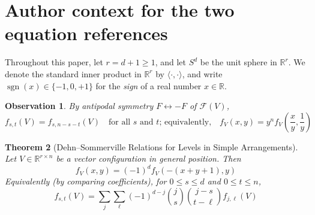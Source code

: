 \documentclass[11pt]{article}
\newtheorem{theorem}{Theorem}
\newtheorem{observation}[theorem]{Observation}
\DeclareMathOperator{\sgn}{sgn}
\renewcommand{\leq}{\leqslant}
\renewcommand{\geq}{\geqslant}
\newcommand{\R}{\mathbb{R}}
\begin{document}
\section*{Author context for the two equation references}
Throughout this paper, let $r=d+1 \geq 1$, and let $S^d$ be the unit sphere in $\R^r$. We denote the standard inner product in $\R^r$ by $\langle\cdot ,\cdot \rangle$, and write $\sgn(x)\in \{-1,0,+1\}$ for the \emph{sign} of a real number 
$x\in \R$. %
\begin{observation} 
\label{obs:f-antipodal-symm} By antipodal symmetry $F\leftrightarrow -F$ of $\mathcal{F}(V)$, 
\begin{equation}
\label{eq:f-symm}
f_{s,t}(V)=f_{s,n-s-t}(V) \quad \textrm{for all $s$ and $t$; equivalently,} \textstyle \quad f_V(x,y)= y^n f_V(\frac{x}{y},\frac{1}{y})
\end{equation}
\end{observation}
\begin{theorem}[Dehn--Sommerville Relations for Levels in Simple Arrangements]
\label{thm:DS-levels}
Let $V \in \R^{r\times n}$ be a vector configuration in general position. Then
\begin{equation}
\label{eq:DS-f-poly}
f_V(x,y)=(-1)^d f_V(-(x+y+1),y)
\end{equation}
Equivalently (by comparing coefficients), for $0\leq s\leq d$ and $0\leq t\leq n$,
\begin{equation}
\label{eq:DS-f-numbers}
f_{s,t}(V)=\sum_{j} \sum_{\ell} (-1)^{d-j} \binom{j}{s} \binom{j-s}{t-\ell} f_{j,\ell}(V) 
\end{equation}
\end{theorem}
\end{document}
